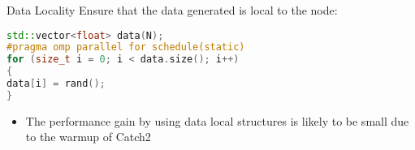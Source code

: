 \begin{frame}[fragile]{Data Locality}
	Ensure that the data generated is local to the node:
	
\begin{lstlisting}[language=C++, frame=single]
std::vector<float> data(N);
#pragma omp parallel for schedule(static)
for (size_t i = 0; i < data.size(); i++)
{
data[i] = rand();
}
\end{lstlisting}
	
	 \begin{itemize}
	 	
	 	\item The performance gain by using data local structures is likely to be small due to the warmup of Catch2
	 	
	 \end{itemize}
\end{frame} 
